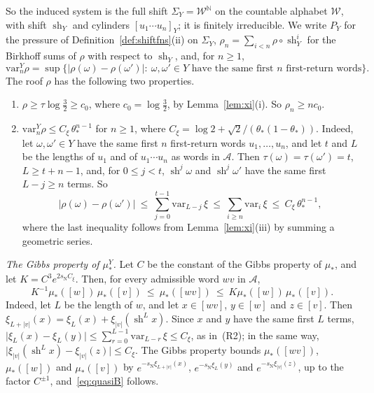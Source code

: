 \documentclass[11pt]{amsart}
\theoremstyle{definition}
\theoremstyle{remark}
\newcommand{\N}{\mathbb N}
\newcommand{\sN}{s_{\mathrm N}}
\newcommand{\abs}[1]{\lvert #1\rvert}
\begin{document}
So the induced system is the full shift $\Sigma_Y=\mathcal W^{\N}$ on the countable alphabet $\mathcal W$, with shift $\operatorname{sh}_Y$ and cylinders $[u_1\cdots u_n]_Y$; it is finitely irreducible. We write $P_Y$ for the pressure of Definition~\ref{def:shiftfns}(ii) on $\Sigma_Y$, $\rho_n=\sum_{i<n}\rho\circ\operatorname{sh}_Y^i$ for the Birkhoff sums of $\rho$ with respect to $\operatorname{sh}_Y$, and, for $n\ge1$,
\[
  \mathrm{var}^Y_n\rho=\sup\bigl\{\abs{\rho(\omega)-\rho(\omega')}:\ \omega,\omega'\in Y\text{ have the same first $n$ first-return words}\bigr\}.
\]
The roof $\rho$ has the following two properties.
\begin{enumerate}
\item[(R1)] $\rho\ge\tau\log\frac32\ge c_0$, where $c_0=\log\frac32$, by Lemma~\ref{lem:xi}(i). So $\rho_n\ge nc_0$.
\item[(R2)] $\mathrm{var}^Y_n\rho\le C_\xi\,\theta_*^{n-1}$ for $n\ge1$, where $C_\xi=\log2+\sqrt2/(\theta_*(1-\theta_*))$. Indeed, let $\omega,\omega'\in Y$ have the same first $n$ first-return words $u_1,\dots,u_n$, and let $t$ and $L$ be the lengths of $u_1$ and of $u_1\cdots u_n$ as words in $\mathcal A$. Then $\tau(\omega)=\tau(\omega')=t$, $L\ge t+n-1$, and, for $0\le j<t$, $\operatorname{sh}^j\omega$ and $\operatorname{sh}^j\omega'$ have the same first $L-j\ge n$ terms. So
\[
  \abs{\rho(\omega)-\rho(\omega')}\ \le\ \sum_{j=0}^{t-1}\mathrm{var}_{L-j}\,\xi\ \le\ \sum_{i\ge n}\mathrm{var}_i\,\xi\ \le\ C_\xi\,\theta_*^{n-1},
\]
where the last inequality follows from Lemma~\ref{lem:xi}(iii) by summing a geometric series.
\end{enumerate}
\emph{The Gibbs property of $\mu_*^Y$.}
Let $C$ be the constant of the Gibbs property of $\mu_*$, and let $K=C^3e^{2\sN C_\xi}$. Then, for every admissible word $wv$ in $\mathcal A$,
\begin{equation}\label{eq:quasiB}
  K^{-1}\mu_*([w])\,\mu_*([v])\ \le\ \mu_*([wv])\ \le\ K\mu_*([w])\,\mu_*([v]).
\end{equation}
Indeed, let $L$ be the length of $w$, and let $x\in[wv]$, $y\in[w]$ and $z\in[v]$. Then $\xi_{L+\abs v}(x)=\xi_L(x)+\xi_{\abs v}(\operatorname{sh}^Lx)$. Since $x$ and $y$ have the same first $L$ terms, $\abs{\xi_L(x)-\xi_L(y)}\le\sum_{r=0}^{L-1}\mathrm{var}_{L-r}\,\xi\le C_\xi$, as in~(R2); in the same way, $\abs{\xi_{\abs v}(\operatorname{sh}^Lx)-\xi_{\abs v}(z)}\le C_\xi$. The Gibbs property bounds $\mu_*([wv])$, $\mu_*([w])$ and $\mu_*([v])$ by $e^{-\sN\xi_{L+\abs v}(x)}$, $e^{-\sN\xi_L(y)}$ and $e^{-\sN\xi_{\abs v}(z)}$, up to the factor $C^{\pm1}$, and~\eqref{eq:quasiB} follows.
\end{document}
